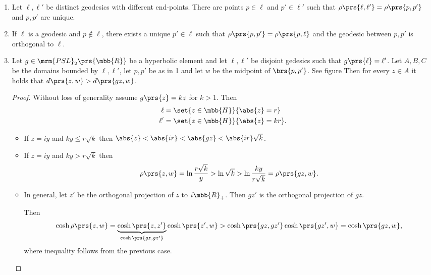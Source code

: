 \documentclass[10pt, twoside]{book}
\begin{document}
\begin{example}
\begin{enumerate}
\item Let $\ell, \ell'$ be distinct geodesics with different end-points. There are points $p \in \ell$ and $p'\in\ell'$ such that $\rho\prs{\ell, \ell'} = \rho\prs{p, p'}$ and $p,p'$ are unique.

\item If $\ell$ is a geodesic and $p \notin \ell$, there exists a unique $p' \in \ell$ such that $\rho\prs{p, p'} = \rho\prs{p, \ell}$ and the geodesic between $p,p'$ is orthogonal to $\ell$.

\item Let $g \in \mrm{PSL}_2\prs{\mbb{R}}$ be a hyperbolic element and let $\ell, \ell'$ be disjoint gedesics such that $g\prs{\ell} = \ell'$. Let $A,B,C$ be the domains bounded by $\ell, \ell'$, let $p,p'$ be as in 1 and let $w$ be the midpoint of $\brs{p,p'}$. See figure
Then for every $z \in A$ it holds that $d\prs{z,w} > d\prs{gz, w}$.

\begin{proof}
Without loss of generality assume $g\prs{z} = kz$ for $k > 1$. Then
\begin{align*}
\ell &= \set{z \in \mbb{H}}{\abs{z} = r} \\
\ell' &= \set{z \in \mbb{H}}{\abs{z} = kr} \text{.}
\end{align*}
\begin{itemize}
\item If $z = iy$ and $ky \leq r \sqrt{k}$ then $\abs{z} < \abs{ir} < \abs{gz} < \abs{ir}\sqrt{k}$.
\item If $z = iy$ and $ky > r \sqrt{k}$ then
\[\rho\prs{z,w} = \ln\frac{r \sqrt{k}}{y} > \ln\sqrt{k} > \ln\frac{ky}{r \sqrt{k}} = \rho\prs{gz, w} \text{.}\]
\item In general, let $z'$ be the orthogonal projection of $z$ to $i\mbb{R}_+$. Then $gz'$ is the orthogonal projection of $gz$.

Then
\begin{align*}
\cosh \rho\prs{z,w} = \underset{\cosh\prs{gz, gz'}}{\underbrace{\cosh\prs{z,z'}}} \cosh\prs{z', w} > \cosh\prs{gz, gz'} \cosh\prs{gz', w} = \cosh\prs{gz,w} \text{,}
\end{align*}
where inequality follows from the previous case.
\end{itemize}
\end{proof}
\end{enumerate}
\end{example}
\end{document}
